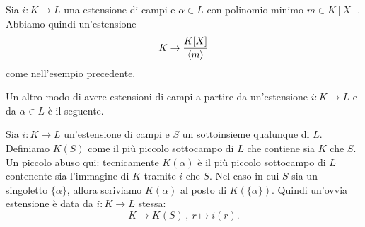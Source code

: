 \begin{cons}
Sia \(i : K \to L\) una estensione di campi e \(\alpha \in L\) con polinomio minimo \(m \in K[X]\). Abbiamo quindi un'estensione
\[K \to \frac{K[X]}{\left\langle m\right\rangle}\]
come nell'esempio precedente.
\end{cons}

Un altro modo di avere estensioni di campi a partire da un'estensione \(i : K \to L\) e da \(\alpha \in L\) è il seguente.

\begin{cons}
Sia \(i : K \to L\) un'estensione di campi e \(S\) un sottoinsieme qualunque di \(L\). Definiamo \(K(S)\) come il più piccolo sottocampo di \(L\) che contiene sia \(K\) che \(S\). Un piccolo abuso qui: tecnicamente \(K(\alpha)\) è il più piccolo sottocampo di \(L\) contenente sia l'immagine di \(K\) tramite \(i\) che \(S\). Nel caso in cui \(S\) sia un singoletto \(\{\alpha\}\), allora scriviamo \(K(\alpha)\) al posto di \(K(\{\alpha\})\). Quindi un'ovvia estensione è data da \(i : K \to L\) stessa:
\[K \to K(S)\,,\ r \mapsto i(r) .\]
\end{cons}

